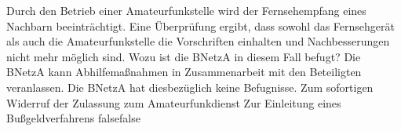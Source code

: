     {Durch den Betrieb einer Amateurfunkstelle wird der Fernsehempfang eines Nachbarn beeinträchtigt. Eine Überprüfung ergibt, dass sowohl das Fernsehgerät als auch die Amateurfunkstelle die Vorschriften einhalten und Nachbesserungen nicht mehr möglich sind. Wozu ist die BNetzA in diesem Fall befugt?}
    {Die BNetzA kann Abhilfemaßnahmen in Zusammenarbeit mit den Beteiligten veranlassen.}
    {Die BNetzA hat diesbezüglich keine Befugnisse.}
    {Zum sofortigen Widerruf der Zulassung zum Amateurfunkdienst}
    {Zur Einleitung eines Bußgeldverfahrens}
    {false}{false}